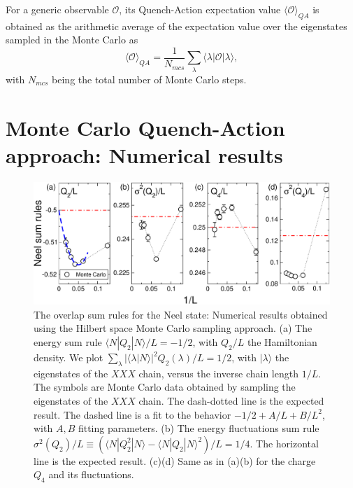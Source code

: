 \documentclass[11pt]{iopart}
\begin{document}
For a generic observable ${\mathcal O}$, its Quench-Action expectation value 
$\langle{\mathcal O}\rangle_{QA}$ is obtained as the arithmetic average of the 
expectation value over the eigenstates sampled in the Monte Carlo as 
%
\begin{equation}
\langle{\mathcal O}\rangle_{QA}=\frac{1}{N_{mcs}}\sum\limits_{\lambda}
\langle\lambda|{\mathcal O}|\lambda\rangle, 
\end{equation}
%
with $N_{mcs}$ being the total number of Monte Carlo steps. 

\section{Monte Carlo Quench-Action approach: Numerical results}
\label{MCQA-nr}

\begin{figure}[t]
\begin{center}
\includegraphics[width=.9\textwidth]{./draft_figs/QAMC_Obs_Neel}
\end{center}
\caption{The overlap sum rules for the Neel state: Numerical results 
 obtained using the Hilbert space Monte Carlo sampling approach. (a) 
 The energy sum rule $\langle N|Q_2|N\rangle/L=-1/2$, with $Q_2/L$ 
 the Hamiltonian density. We plot $\sum_{\lambda}|\langle\lambda|
 N\rangle|^2Q_2(\lambda)/L=1/2$, with $|\lambda\rangle$ the 
 eigenstates of the $XXX$ chain, versus the inverse chain length $1/L$. 
 The symbols are Monte Carlo data obtained by sampling the eigenstates 
 of the $XXX$ chain. The dash-dotted line is the expected result. The 
 dashed line is a fit to the behavior $-1/2+A/L+B/L^2$, with $A,B$ 
 fitting parameters. (b) The energy fluctuations sum rule $\sigma^2(Q_2)/
 L\equiv(\langle N|Q_2^2|N\rangle-\langle N|Q_2|N\rangle^2)/L=1/4$. The 
 horizontal line is the expected result. (c)(d) Same as in (a)(b) for 
 the charge $Q_4$ and its fluctuations. 
}
\label{fig5-neel-sr}
\end{figure}
\end{document}

